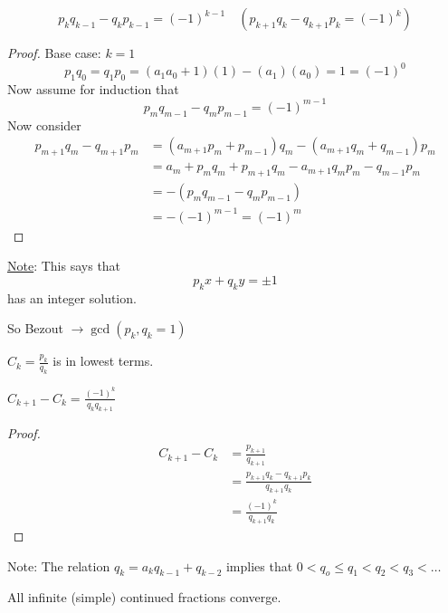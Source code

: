     \begin{theorem}
        \[
            p_kq_{k-1} - q_kp_{k-1} = (-1)^{k-1} \quad (p_{k+1}q_k - q_{k+1}p_k = (-1)^k)
        \]
        \begin{proof}
            Base case: $k=1$
            \[
                p_1q_0 = q_1p_0 = (a_1a_0+1)(1)-(a_1)(a_0) = 1 = (-1)^0
            \]
            Now assume for induction that 
            \[
                p_mq_{m-1} - q_mp_{m-1} = (-1)^{m-1}
            \]
            Now consider 
            \begin{align*}
                p_{m+1}q_m - q_{m+1}p_m &= (a_{m+1}p_m + p_{m-1})q_m - (a_{m+1}q_m + q_{m-1})p_m \\
                &= a_m + p_mq_m + p_{m+1}q_m - a_{m+1}q_mp_m - q_{m-1}p_m \\
                &= -(p_mq_{m-1} - q_mp_{m-1}) \\
                &= -(-1)^{m-1} = (-1)^m
            \end{align*}
        \end{proof}
    \end{theorem}
    
    \underline{Note}: This says that 
    \[
        p_kx+q_ky = \pm 1
    \]
    has an integer solution. 

    So Bezout $\rightarrow \gcd(p_k,q_k = 1)$

    \begin{corollary}
        $C_k = \frac{p_k}{q_k}$ is in lowest terms.
    \end{corollary}

    \begin{corollary}
        $C_{k+1} - C_k = \frac{(-1)^k}{q_kq_{k+1}}$
        \begin{proof}
            \begin{align*}
                C_{k+1} - C_k &= \frac{p_{k+1}}{q_{k+1}} \\
                &= \frac{p_{k+1}q_k - q_{k+1}p_k}{q_{k+1}q_k} \\
                &= \frac{(-1)^k}{q_{k+1}q_k}
            \end{align*}
        \end{proof}
    \end{corollary}
    
    Note: The relation $q_k = a_kq_{k-1} + q_{k-2}$
    implies that $0 < q_o \le q_1 < q_2 < q_3 <\dots$

    \begin{corollary}
        All infinite (simple) continued fractions converge.
    \end{corollary}

